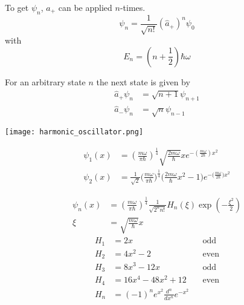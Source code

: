 To get $\psi_n$, $\widehat{a}_{+}$ can be applied $n$-times.
\begin{equation*}
    \psi_n = \frac{1}{\sqrt{n!}}{\left(\widehat{a}_{+}\right)}^n \psi_0
\end{equation*}
with
\begin{equation*}
    E_n = (n+\frac{1}{2})\hbar\omega
\end{equation*}

For an arbitrary state $n$ the next state is given by
\begin{align*}
    \widehat{a}_{+}\psi_n & = \sqrt{n+1}\psi_{n+1} \\
    \widehat{a}_{-}\psi_n & = \sqrt{n}\psi_{n-1}
\end{align*}

\texttt{[image: harmonic\_oscillator.png]}

\newpar{}

\begin{align*}
    \psi_{1}(x) & ={\left(\frac{m\omega}{\pi\hbar}\right)}^{\frac{1}{4}}\sqrt{\frac{2m\omega}{\hbar}}xe^{-\left(\frac{m\omega}{2\hbar}\right)x^{2}}                      \\
    \psi_{2}(x) & =\frac{1}{\sqrt{2}}\Big(\frac{m\omega}{\pi\hbar}\Big)^{\frac{1}{4}}\Big(\frac{2m\omega}{\hbar}x^{2}-1\Big)e^{-\Big(\frac{m\omega}{2\hbar}\Big)x^{2}}
\end{align*}


\noindent\begin{align*}
    \psi_n(x) & ={\left(\frac{m\omega}{\pi\hbar}\right)}^{\frac{1}{4}}\frac{1}{\sqrt{2^n n!}}H_n(\xi)\exp\left(-\frac{\xi^2}{2}\right) \\
    \xi       & =\sqrt{\frac{m\omega}{\hbar}}x
\end{align*}
{\tiny\noindent\begin{align*}
    H_1 & = 2x                                         &  & \text{odd}  \\
    H_2 & = 4x^2-2                                     &  & \text{even} \\
    H_3 & = 8x^3-12x                                   &  & \text{odd}  \\
    H_4 & = 16x^4-48x^2+12                             &  & \text{even} \\
    H_n & = {(-1)}^n e^{x^2} \frac{d^n}{dx^n} e^{-x^2}
\end{align*}
}

